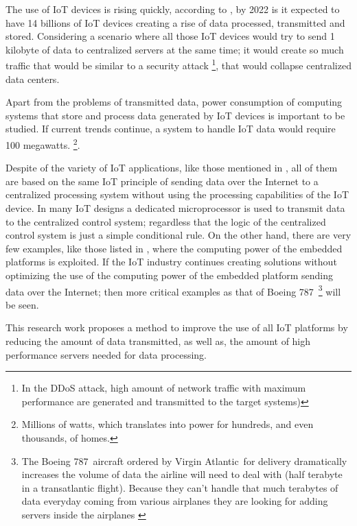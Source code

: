 The use of IoT devices is rising quickly, according to \cite{Benkhelifa}, by
2022 is it expected to have 14 billions of IoT devices creating a rise of
data processed, transmitted and stored. Considering a scenario where all those IoT
devices would try to send 1 kilobyte of data to centralized servers at the same
time; it would create so much traffic that would be similar to a security
attack \footnote{ In the DDoS attack, high amount of network traffic with
maximum performance are generated and transmitted  to the target
systems\cite{Yang})}, that would collapse centralized data centers.

Apart from the problems of transmitted data, power consumption of
computing systems that store and process data generated by IoT devices
is important to be studied. If current trends continue, a system to handle
IoT data would require 100 megawatts. \cite{Xizhou} \footnote{Millions of
watts, which translates into power for hundreds, and even thousands, of
homes.\cite{Kenward}}. 

Despite of the variety of IoT applications, like those mentioned in
\cite{Liu-Dan} \cite{Du}, all of them are based on the same IoT principle of
sending data over the Internet to a centralized processing system without using
the processing capabilities of the IoT device.  In many IoT designs \cite{Du}
a dedicated microprocessor is used to transmit data to the centralized
control system; regardless that the logic of the centralized control system is
just a simple conditional rule. On the other hand, there are very few examples,
like those listed in \cite{Wun}, where the computing power of the embedded
platforms is exploited. If the IoT industry continues creating solutions
without optimizing the use of the computing power of the embedded platform
sending data over the Internet; then more critical examples as that of Boeing
787\textregistered\  \footnote{ The Boeing 787\textregistered\ aircraft ordered
by Virgin Atlantic\textregistered\  for delivery dramatically increases the
volume of data the airline will need to deal with (half terabyte in a
transatlantic flight). Because they can't handle that much terabytes of data
everyday coming from various airplanes they are looking for adding servers
inside the airplanes \cite{Virgin}} will be seen.

This research work proposes a method to improve the use of all IoT platforms by
reducing the amount of data transmitted, as well as, the amount of high
performance servers needed for data processing. 


